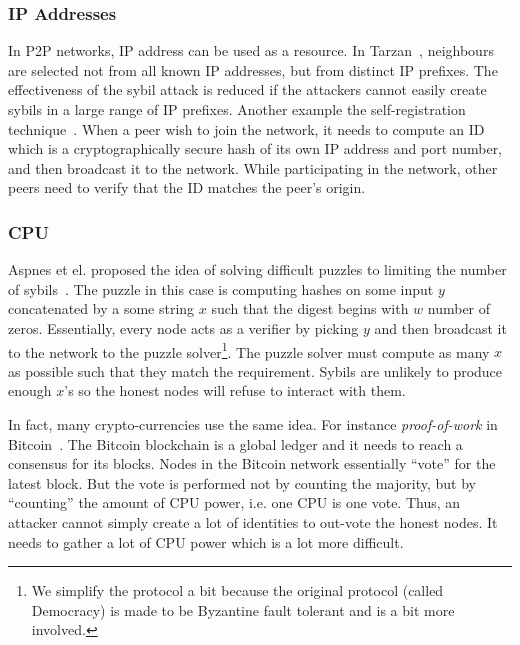 
\subsubsection{IP Addresses}
In P2P networks, IP address can be used as a resource. In
Tarzan~\cite{freedman2002tarzan}, neighbours are selected not from all known IP
addresses, but from distinct IP prefixes. The effectiveness of the sybil attack
is reduced if the attackers cannot easily create sybils in a large range of IP
prefixes. Another example the self-registration
technique~\cite{dinger2006defending}. When a peer wish to join the network, it
needs to compute an ID which is a cryptographically secure hash of its own IP
address and port number, and then broadcast it to the network. While
participating in the network, other peers need to verify that the ID matches the
peer's origin.

\subsubsection{CPU}
Aspnes et el. proposed the idea of solving difficult puzzles to limiting the
number of sybils~\cite{aspnes2005exposing}. The puzzle in this case is computing
hashes on some input $y$ concatenated by a some string $x$ such that the digest
begins with $w$ number of zeros. Essentially, every node acts as a verifier by
picking $y$ and then broadcast it to the network to the puzzle
solver\footnote{We simplify the protocol a bit because the original protocol
  (called Democracy) is made to be Byzantine fault tolerant and is a bit more
  involved.}. The puzzle solver must compute as many $x$ as possible such that
they match the requirement. Sybils are unlikely to produce enough $x$'s so the
honest nodes will refuse to interact with them.

In fact, many crypto-currencies use the same idea. For instance
\emph{proof-of-work} in Bitcoin~\cite{nakamoto2008bitcoin}. The Bitcoin
blockchain is a global ledger and it needs to reach a consensus for its blocks.
Nodes in the Bitcoin network essentially ``vote'' for the latest block. But the
vote is performed not by counting the majority, but by ``counting'' the amount
of CPU power, i.e. one CPU is one vote. Thus, an attacker cannot simply create a
lot of identities to out-vote the honest nodes. It needs to gather a lot of CPU
power which is a lot more difficult.

